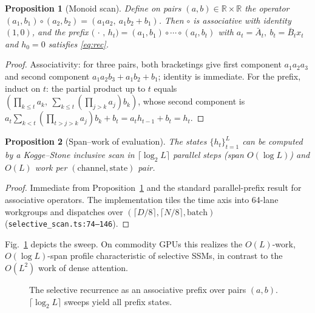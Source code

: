\documentclass[journal,onecolumn,11pt]{IEEEtran}
\newtheorem{proposition}{Proposition}
\newcommand{\Abar}{\bar{A}}
\newcommand{\Bbar}{\bar{B}}
\newcommand{\R}{\mathbb{R}}
\begin{document}
\begin{proposition}[Monoid scan]
\label{prop:monoid}
Define on pairs $(a,b)\in\R\times\R$ the operator
$(a_1,b_1)\circ(a_2,b_2)=(a_1a_2,\ a_1 b_2+b_1)$. Then $\circ$ is associative
with identity $(1,0)$, and the prefix
$\big(\,\cdot\,,\,h_t\big)=(a_1,b_1)\circ\cdots\circ(a_t,b_t)$ with
$a_t=\Abar_t,\ b_t=\Bbar_t x_t$ and $h_0=0$ satisfies \eqref{eq:rec}.
\end{proposition}
\begin{proof}
Associativity: for three pairs, both bracketings give first component
$a_1a_2a_3$ and second component $a_1a_2b_3+a_1b_2+b_1$; identity is immediate.
For the prefix, induct on $t$: the partial product up to $t$ equals
$(\prod_{k\le t}a_k,\ \sum_{k\le t}(\prod_{j>k}a_j)b_k)$, whose second component
is $a_t\!\sum_{k<t}(\prod_{t>j>k}a_j)b_k+b_t=a_t h_{t-1}+b_t=h_t$.
\end{proof}

\begin{proposition}[Span--work of evaluation]
\label{prop:span}
The states $\{h_t\}_{t=1}^{L}$ can be computed by a Kogge--Stone inclusive scan in
$\lceil\log_2 L\rceil$ parallel steps (span $O(\log L)$) and $O(L)$ work per
$(\text{channel},\text{state})$ pair.
\end{proposition}
\begin{proof}
Immediate from Proposition~\ref{prop:monoid} and the standard parallel-prefix
result for associative operators. The implementation tiles the time axis into
64-lane workgroups and dispatches over
$(\lceil D/8\rceil,\lceil N/8\rceil,\text{batch})$
(\texttt{selective\_scan.ts:74--146}).
\end{proof}
Fig.~\ref{fig:scan} depicts the sweep. On commodity GPUs this realizes the
$O(L)$-work, $O(\log L)$-span profile characteristic of selective SSMs, in
contrast to the $O(L^2)$ work of dense attention.

\begin{figure}[t]
\centering

\caption{The selective recurrence as an associative prefix over pairs $(a,b)$.
$\lceil\log_2 L\rceil$ sweeps yield all prefix states.}
\label{fig:scan}
\end{figure}
\end{document}
